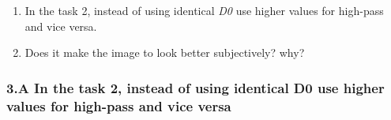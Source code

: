 \documentclass[11pt]{article}
\providecommand{\tightlist}{%
      \setlength{\itemsep}{0pt}\setlength{\parskip}{0pt}}
\begin{document}
\begin{enumerate}
\def\labelenumi{\arabic{enumi}.}
\tightlist
\item
  In the task 2, instead of using identical \emph{D0} use higher values
  for high-pass and vice versa.
\item
  Does it make the image to look better subjectively? why?
\end{enumerate}

    \hypertarget{a-in-the-task-2-instead-of-using-identical-d0-use-higher-values-for-high-pass-and-vice-versa}{%
\subsubsection{3.A In the task 2, instead of using identical D0 use
higher values for high-pass and vice
versa}\label{a-in-the-task-2-instead-of-using-identical-d0-use-higher-values-for-high-pass-and-vice-versa}}
\end{document}
